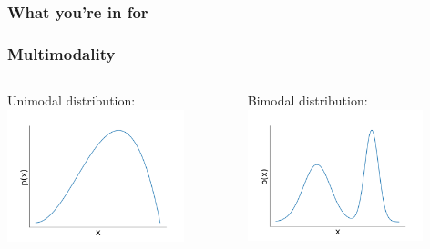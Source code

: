 \documentclass[t,aspectratio=169]{beamer}
\begin{document}
\begin{frame}
  \frametitle{What you're in for}
\end{frame}

\begin{frame}
  \frametitle{Multimodality}
  \begin{columns}
    \begin{column}{0.48\textwidth}
      Unimodal distribution:
      \includegraphics[width=0.8\textwidth]{images/unimodal}
    \end{column}
    \begin{column}{0.48\textwidth}
      Bimodal distribution:
      \includegraphics[width=0.8\textwidth]{images/bimodal}
    \end{column}
  \end{columns}
\end{frame}
\end{document}
